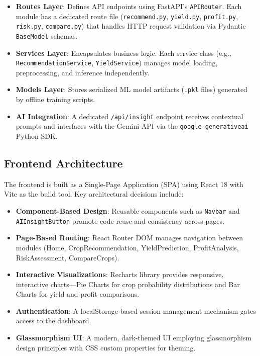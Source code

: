 \begin{itemize}
    \item \textbf{Routes Layer}: Defines API endpoints using FastAPI's \texttt{APIRouter}. Each module has a dedicated route file (\texttt{recommend.py}, \texttt{yield.py}, \texttt{profit.py}, \texttt{risk.py}, \texttt{compare.py}) that handles HTTP request validation via Pydantic \texttt{BaseModel} schemas.
    \item \textbf{Services Layer}: Encapsulates business logic. Each service class (e.g., \texttt{RecommendationService}, \texttt{YieldService}) manages model loading, preprocessing, and inference independently.
    \item \textbf{Models Layer}: Stores serialized ML model artifacts (\texttt{.pkl} files) generated by offline training scripts.
    \item \textbf{AI Integration}: A dedicated \texttt{/api/insight} endpoint receives contextual prompts and interfaces with the Gemini API via the \texttt{google-generativeai} Python SDK.
\end{itemize}

\subsection{Frontend Architecture}
The frontend is built as a Single-Page Application (SPA) using React 18 with Vite as the build tool. Key architectural decisions include:

\begin{itemize}
    \item \textbf{Component-Based Design}: Reusable components such as \texttt{Navbar} and \texttt{AIInsightButton} promote code reuse and consistency across pages.
    \item \textbf{Page-Based Routing}: React Router DOM manages navigation between modules (Home, CropRecommendation, YieldPrediction, ProfitAnalysis, RiskAssessment, CompareCrops).
    \item \textbf{Interactive Visualizations}: Recharts library provides responsive, interactive charts---Pie Charts for crop probability distributions and Bar Charts for yield and profit comparisons.
    \item \textbf{Authentication}: A localStorage-based session management mechanism gates access to the dashboard.
    \item \textbf{Glassmorphism UI}: A modern, dark-themed UI employing glassmorphism design principles with CSS custom properties for theming.
\end{itemize}

